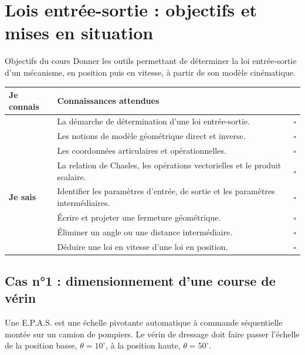 
\section{Lois entrée-sortie : objectifs et mises en situation}
\label{sec:les-objectifs}

\begin{TLThreeMethod}{Objectifs du cours}
Donner les outils permettant de déterminer la loi entrée-sortie d'un
mécanisme, en position puis en vitesse, à partir de son modèle
cinématique.
\end{TLThreeMethod}

\begin{center}
\small
\begin{tabularx}{\linewidth}{>{\bfseries}p{2cm}X c}
\toprule
Je connais & Connaissances attendues & \\
\midrule
& La démarche de détermination d'une loi entrée-sortie. & $\square$\\
& Les notions de modèle géométrique direct et inverse. & $\square$\\
& Les coordonnées articulaires et opérationnelles. & $\square$\\
& La relation de Chasles, les opérations vectorielles et le produit scalaire. & $\square$\\
\midrule
Je sais & Identifier les paramètres d'entrée, de sortie et les paramètres intermédiaires. & $\square$\\
& Écrire et projeter une fermeture géométrique. & $\square$\\
& Éliminer un angle ou une distance intermédiaire. & $\square$\\
& Déduire une loi en vitesse d'une loi en position. & $\square$\\
\bottomrule
\end{tabularx}
\end{center}

\subsection{Cas n°1 : dimensionnement d'une course de vérin}

Une E.P.A.S. est une échelle pivotante automatique à commande
séquentielle montée sur un camion de pompiers. Le vérin de dressage doit
faire passer l'échelle de la position basse, $\theta=10^\circ$, à la
position haute, $\theta=50^\circ$.


